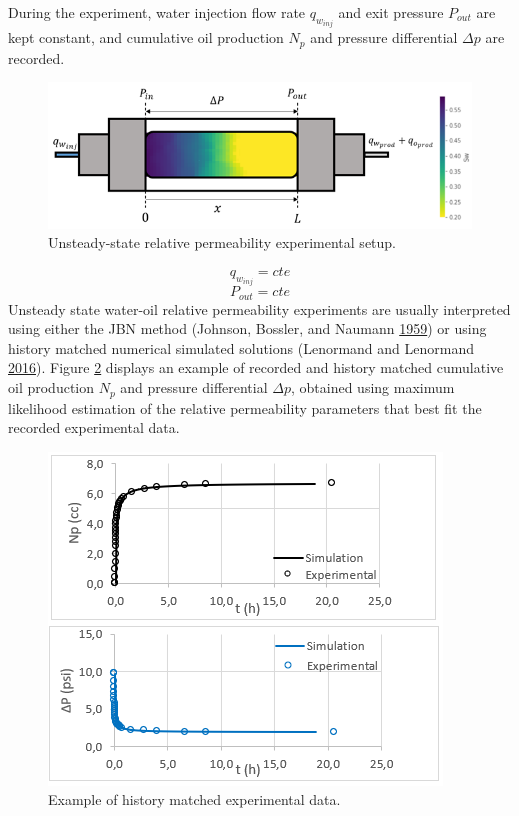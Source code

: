 \documentclass[english,msc,numbers]{coppe}
\begin{document}
  During the experiment, water injection flow rate \(q_{w_{inj}}\) and exit pressure \(P_{out}\) are kept constant, and cumulative oil production \(N_p\) and pressure differential \(\Delta p\) are recorded.
  \begin{figure}
  
  {\centering \includegraphics[width=1\linewidth]{figure/2-13-krel-experiment} 
  
  }
  
  \caption{Unsteady-state relative permeability experimental setup.}\label{fig:krel-experiment}
  \end{figure}
  \begin{equation} 
    q_{w_{inj}} = cte 
    \label{eq:qwinj}
  \end{equation}
  \begin{equation} 
    P_{out} = cte 
    \label{eq:pout}
  \end{equation}
  Unsteady state water-oil relative permeability experiments are usually interpreted using either the JBN method (Johnson, Bossler, and Naumann \protect\hyperlink{ref-Johnson1959}{1959}) or using history matched numerical simulated solutions (Lenormand and Lenormand \protect\hyperlink{ref-Lenormand2016}{2016}). Figure \ref{fig:krel-Np-dP} displays an example of recorded and history matched cumulative oil production \(N_p\) and pressure differential \(\Delta p\), obtained using maximum likelihood estimation of the relative permeability parameters that best fit the recorded experimental data.
  \begin{figure}
  
  {\centering \includegraphics[width=0.7\linewidth]{figure/2-14-krel-Np-dP} 
  
  }
  
  \caption{Example of history matched experimental data.}\label{fig:krel-Np-dP}
  \end{figure}
\end{document}
